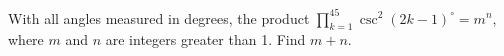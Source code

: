 With all angles measured in degrees, the product $\prod_{k=1}^{45} \csc^2(2k-1)^\circ=m^n$,  where $m$ and $n$ are integers greater than 1. Find $m+n$.